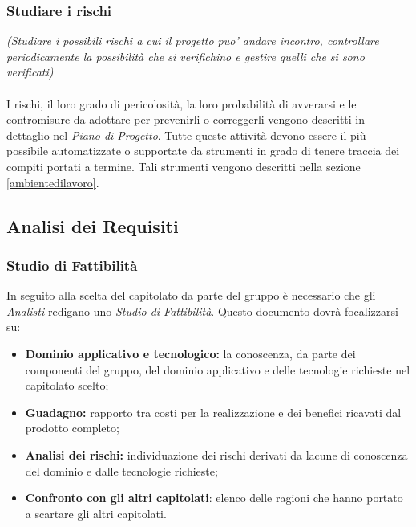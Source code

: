 \subsubsection{Studiare i rischi}
\textit{(Studiare i possibili rischi a cui il progetto puo' andare incontro, controllare periodicamente la possibilità che si verifichino e gestire quelli che si sono verificati)}\\ \\
I rischi, il loro grado di pericolosità, la loro probabilità di avverarsi e le contromisure da adottare per prevenirli o correggerli vengono descritti in dettaglio nel \textit{Piano di Progetto}.
Tutte queste attività devono essere il più possibile automatizzate o supportate da strumenti in grado di tenere traccia dei compiti portati a termine. Tali strumenti vengono descritti nella sezione \ref{ambientedilavoro}.


\subsection{Analisi dei Requisiti}
\subsubsection{Studio di Fattibilità}
In seguito alla scelta del capitolato da parte del gruppo è necessario che gli \textit{Analisti} redigano uno \textit{Studio di Fattibilità}. Questo documento dovrà focalizzarsi su:
\begin{itemize}
\item \textbf{Dominio applicativo e tecnologico:} la conoscenza, da parte dei componenti del gruppo, del dominio applicativo e delle tecnologie richieste nel capitolato scelto; 
\item \textbf{Guadagno:} rapporto tra costi per la realizzazione e dei benefici ricavati dal prodotto completo;
\item \textbf{Analisi dei rischi:} individuazione dei rischi derivati da lacune di conoscenza del dominio e dalle tecnologie richieste;
\item \textbf{Confronto con gli altri capitolati}: elenco delle ragioni che hanno portato a scartare gli altri capitolati.
\end{itemize}
